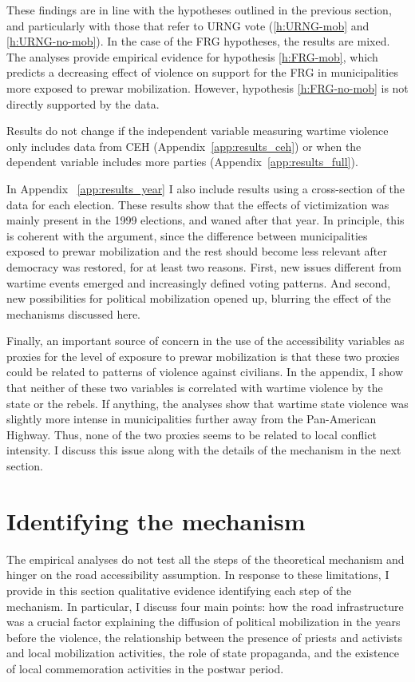 \documentclass[12pt, notitlepage]{article}
\begin{document}
These findings are in line with the hypotheses outlined in the previous section, and particularly with those that refer to URNG vote (\ref{h:URNG-mob} and \ref{h:URNG-no-mob}).
In the case of the FRG hypotheses, the results are mixed.
The analyses provide empirical evidence for hypothesis \ref{h:FRG-mob}, which predicts a decreasing effect of violence on support for the FRG in municipalities more exposed to prewar mobilization.
However, hypothesis \ref{h:FRG-no-mob} is not directly supported by the data.

Results do not change if the independent variable measuring wartime violence only includes data from CEH (Appendix~\ref{app:results_ceh}) or when the dependent variable includes more parties (Appendix~\ref{app:results_full}).

In Appendix ~\ref{app:results_year} I also include results using a cross-section of the data for each election.
These results show that the effects of victimization was mainly present in the 1999 elections, and waned after that year.
In principle, this is coherent with the argument, since the difference between municipalities exposed to prewar mobilization and the rest should become less relevant after democracy was restored, for at least two reasons.
First, new issues different from wartime events emerged and increasingly defined voting patterns.
And second, new possibilities for political mobilization opened up, blurring the effect of the mechanisms discussed here.

Finally, an important source of concern in the use of the accessibility variables as proxies for the level of exposure to prewar mobilization is that these two proxies could be related to patterns of violence against civilians.
In the appendix, I show that neither of these two variables is correlated with wartime violence by the state or the rebels.
If anything, the analyses show that wartime state violence was slightly more intense in municipalities further away from the Pan-American Highway.
Thus, none of the two proxies seems to be related to local conflict intensity.
I discuss this issue along with the details of the mechanism in the next section.

\section*{Identifying the mechanism}\label{sec:mechanism}

The empirical analyses do not test all the steps of the theoretical mechanism and hinger on the road accessibility assumption.
In response to these limitations, I provide in this section qualitative evidence identifying each step of the mechanism.
In particular, I discuss four main points: how the road infrastructure was a crucial factor explaining the diffusion of political mobilization in the years before the violence, the relationship between the presence of priests and activists and local mobilization activities, the role of state propaganda, and the existence of local commemoration activities in the postwar period.
\end{document}
